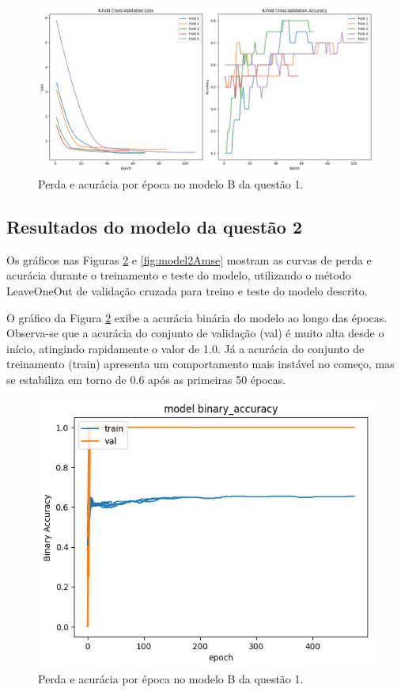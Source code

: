 \documentclass[12pt]{article}
\begin{document}
\begin{figure}[H]
    \centering
    \includegraphics[width=1\linewidth]{casoB1.png}
    \caption{Perda e acurácia por época no modelo B da questão 1.}
    \label{fig:model1BGraphs}
\end{figure}

\subsection{Resultados do modelo da questão 2}

Os gráficos nas Figuras \ref{fig:model2bacc} e \ref{fig:model2Amse} mostram as curvas de perda e acurácia durante o treinamento e teste do modelo, utilizando o método LeaveOneOut de validação cruzada para treino e teste do modelo descrito.

O gráfico da Figura \ref{fig:model2bacc} exibe a acurácia binária do modelo ao longo das épocas. Observa-se que a acurácia do conjunto de validação (val) é muito alta desde o início, atingindo rapidamente o valor de 1.0. Já a acurácia do conjunto de treinamento (train) apresenta um comportamento mais instável no começo, mas se estabiliza em torno de 0.6 após as primeiras 50 épocas.

\begin{figure}[h]
    \centering
    \includegraphics[width=0.8\linewidth]{bacc.png}
    \caption{Perda e acurácia por época no modelo B da questão 1.}
    \label{fig:model2bacc}
\end{figure}
\end{document}
